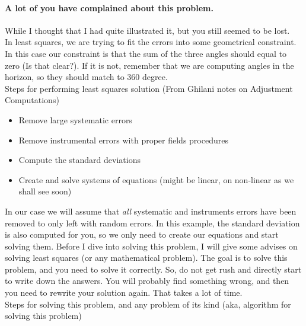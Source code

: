 \documentclass[]{scrartcl}
\begin{document}
\paragraph{A lot of you have complained about this problem.}While I thought that I had quite illustrated it, but you still seemed to be lost.\\
In least squares, we are trying to fit the errors into some geometrical constraint. In this case our constraint is that the sum of the three angles should equal to zero (Is that clear?). If it is not, remember that we are computing angles in the horizon, so they should match to 360 degree.
\\
Steps for performing least squares solution (From Ghilani notes on Adjustment Computations)
\begin{itemize}
	\item Remove large systematic errors
	\item Remove instrumental errors with proper fields procedures
	\item Compute the standard deviations
	\item Create and solve systems of equations (might be linear, on non-linear as we shall see soon)
\end{itemize}
In our case we will assume that \textit{all} systematic and instruments errors have been removed to only left with random errors. In this example, the standard deviation is also computed for you, so we only need to create our equations and start solving them. Before I dive into solving this problem, I will give some advises on solving least squares (or any mathematical problem). The goal is to solve this problem, and you need to solve it correctly. So, do not get rush and directly start to write down the answers. You will probably find something wrong, and then you need to rewrite your solution again. That takes a lot of time.
\\
Steps for solving this problem, and any problem of its kind (aka, algorithm for solving this problem)
\end{document}
